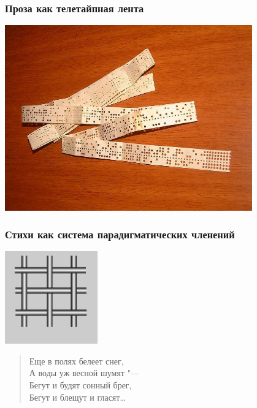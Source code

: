 \documentclass{beamer}
\begin{document}

\begin{frame}
\frametitle{Проза как телетайпная лента}

\begin{center}
\includegraphics[width=0.8\textwidth]{lenta.jpg}
\end{center}

\end{frame}


\begin{frame}
\frametitle{Стихи как система парадигматических членений}

\begin{center}
\includegraphics[width=0.3\textwidth]{reshetka.jpg}
\end{center}

\begin{verse}
Еще в полях белеет \color{red}снег, \\
\color{black}А воды уж весной \color{green}шумят "--- \\
\color{blue}Бегут \color{black}и будят сонный \color{red}брег, \\
\color{blue}Бегут \color{black}и блещут и \color{green}гласят\color{black}\dots
\end{verse}
\end{frame}
\end{document}
